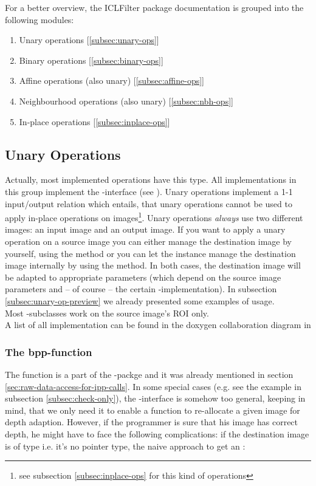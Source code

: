 For a better overview, the ICLFilter package documentation is grouped into the following modules:

\begin{enumerate}
\item Unary operations [\ref{subsec:unary-ops}]
\item Binary operations [\ref{subsec:binary-ops}]
\item Affine operations (also unary) [\ref{subsec:affine-ops}]
\item Neighbourhood operations (also unary) [\ref{subsec:nbh-ops}]
\item In-place operations [\ref{subsec:inplace-ops}] 
\end{enumerate}


\subsection{Unary Operations\label{subsec:unary-ops}}
Actually, most implemented operations have this type. All implementations in this group implement the -interface (see ). Unary operations implement a 1-1 input/output relation which entails, that unary operations cannot be used to apply in-place operations on images\footnote{see subsection \ref{subsec:inplace-ops} for this kind of operations}. Unary operations \emph{always} use two different images: an input image and an output image. If you want to apply a unary operation on a source image you can either manage the destination image by yourself, using the 
method or you can let the  instance manage the destination image internally by using the 
method. In both cases, the destination image will be adapted to appropriate parameters (which depend on the source image parameters and -- of course -- the certain -implementation). In subsection \ref{subsec:unary-op-preview} we already presented some examples of  usage.\\
Most -subclasses work on the source image's ROI only.\\

A list of all  implementation can be found in the doxygen collaboration diagram in 

\subsubsection{The bpp-function\label{subsec:bpp}}
The  function is a part of the -packge and it was already mentioned in section \ref{sec:raw-data-access-for-ipp-calls}. In some special cases (e.g. see the example in subsection \ref{subsec:check-only}), the -interface is somehow too general, keeping in mind, that we only need it to enable a function to re-allocate a given image for depth adaption. However, if the programmer is sure that his image has correct depth, he might have to face the following complications: if the destination image is of type  i.e. it's no pointer type, the naive approach to get an :

